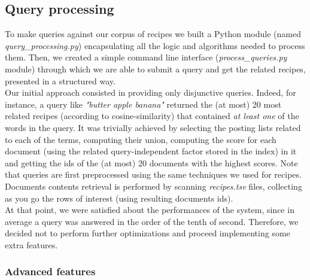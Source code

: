 \subsection{Query processing}

To make queries against our corpus of recipes we built a Python module (named \textit{query\_processing.py}) encapsulating all the logic and algorithms needed to process them. Then, we created a simple command line interface (\textit{process\_queries.py} module) through which we are able to submit a query and get the related recipes, presented in a structured way.\\
Our initial approach consisted in providing only disjunctive queries. Indeed, for instance, a query like \textit{"butter apple banana"} returned the (at most) 20 most related recipes (according to cosine-similarity) that contained \textit{at least one} of the words in the query. It was trivially achieved by selecting the posting lists related to each of the terms, computing their union, computing the score for each document (using the related query-independent factor stored in the index) in it and getting the ids of the (at most) 20 documents with the highest scores. Note that queries are first preprocessed using the same techniques we used for recipes. Documents contents retrieval is performed by scanning \textit{recipes.tsv} files, collecting as you go the rows of interest (using resulting documents ids).\\
At that point, we were satisfied about the performances of the system, since in average a query was answered in the order of the tenth of second. Therefore, we decided not to perform further optimizations and proceed implementing some extra features.


\subsubsection{Advanced features}


